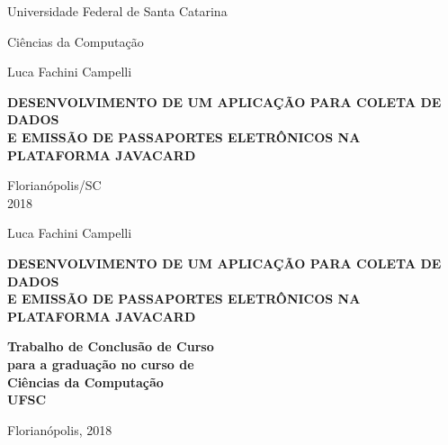 \documentclass{article}
\begin{document}
	\begin{center}

		{\LARGE Universidade Federal de Santa Catarina \par}
		\vspace {2cm}
		
		Ciências da Computação
		\vspace{2cm}

		Luca Fachini Campelli
		\vspace {4cm}

		\textbf{DESENVOLVIMENTO DE UM APLICAÇÃO PARA COLETA DE DADOS \\
				E EMISSÃO DE PASSAPORTES ELETRÔNICOS NA PLATAFORMA JAVACARD}
		\vspace {10cm}
		
		Florianópolis/SC \\

		2018
	\end{center}

	\newpage
	\begin{center}
		Luca Fachini Campelli
		\vspace{2cm}
		
		\textbf{\large DESENVOLVIMENTO DE UM APLICAÇÃO PARA COLETA DE DADOS \\
				E EMISSÃO DE PASSAPORTES ELETRÔNICOS NA PLATAFORMA JAVACARD}
		\vspace{2cm}

		\hfill \textbf{Trabalho de Conclusão de Curso \\}
		\hfill \textbf{para a graduação no curso de\\}
		\hfill \textbf{Ciências \hspace{18pt} da \hspace{18pt} Computação \\}
		\hfill \textbf{UFSC  \hspace{60pt}}

		\vspace{1cm}

		\hfill Florianópolis, 2018

	\end{center}

	\newpage
\end{document}
